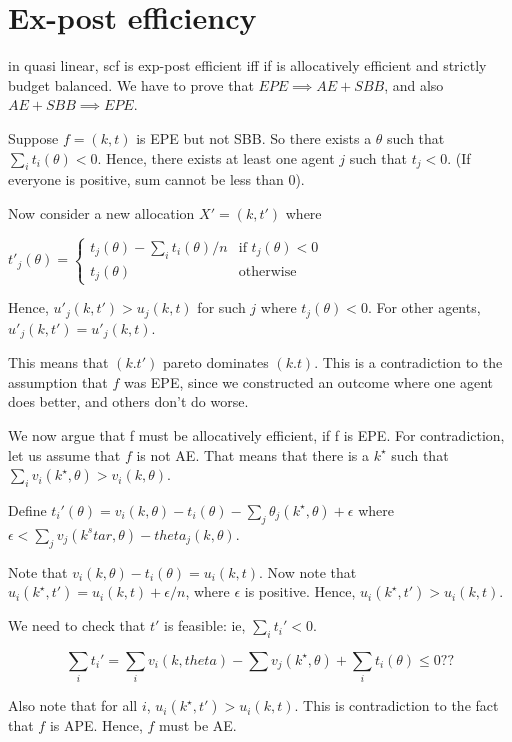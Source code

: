 \documentclass[11pt]{book}
\begin{document}
\section{Ex-post efficiency}
in quasi linear, scf is exp-post efficient iff if is allocatively efficient
and strictly budget balanced. We have to prove that $EPE \implies AE + SBB$,
and also $AE + SBB \implies EPE$.

Suppose $f = (k, t)$ is EPE but not SBB. So there exists a $\theta$ such that 
$\sum_i t_i(\theta) < 0$. Hence, there exists at least
one agent $j$ such that $t_j < 0$. (If everyone is positive, sum cannot be less than 0).

Now consider a new allocation $X' = (k, t')$ where 

$t'_j(\theta) = 
\begin{cases}
    t_j(\theta) -  \sum_i t_i(\theta)/n & \text{if $t_j(\theta) < 0$} \\
    t_j(\theta) & \text{otherwise}
\end{cases}
$ 

Hence, $u'_j(k, t') > u_j(k, t)$ for such $j$ where $t_j(\theta) < 0$.
For other agents, $u'_j(k, t') = u'_j(k, t)$.

This means that $(k. t')$ pareto dominates $(k. t)$. This is a contradiction
to the assumption that $f$ was EPE, since we constructed an outcome where
one agent does better, and others don't do worse.

We now argue that f must be allocatively efficient, if  f is EPE. For contradiction,
let us assume that $f$ is not AE.
That means that there is a $k^\star$ such that
$\sum_i v_i(k^\star, \theta) > v_i (k, \theta)$.

Define $t_i'(\theta)  = v_i(k, \theta) - t_i (\theta) - \sum_j \theta_j(k^\star, \theta) + \epsilon$
where $\epsilon < \sum_j v_j(k^star, \theta) - theta_j (k, \theta)$.

Note that $v_i(k, \theta) - t_i (\theta)  = u_i(k, t)$. 
Now note that
$u_i(k^\star, t') = u_i(k, t) + \epsilon/n$, where $\epsilon$ is positive.
Hence, $u_i(k^\star, t') > u_i(k, t)$. 

We need to check that $t'$ is feasible: ie, $\sum_i t_i' < 0$.

$$
\sum_i t_i' = \sum_i v_i(k, theta) - \sum v_j(k^\star, \theta) + \sum_i t_i(\theta) \leq 0??
$$

Also note that for all $i$, $u_i(k^\star, t') > u_i(k, t)$. This is contradiction
to the fact that $f$ is APE. Hence, $f$ must be AE.
\end{document}
